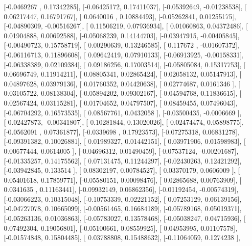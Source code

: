 \documentclass{article}
\begin{document}
       [-0.0469267 ,  0.17342285],
       [-0.06425172,  0.17411037],
       [-0.05392649, -0.01238538],
       [ 0.06217447,  0.16791767],
       [ 0.0640016 ,  0.10884493],
       [-0.05262841,  0.01255175],
       [-0.04890309, -0.00516267],
       [ 0.11506219,  0.07936934],
       [ 0.01060863,  0.04372486],
       [ 0.01904888,  0.00692588],
       [-0.05068239,  0.14144703],
       [-0.03947915, -0.00405845],
       [-0.00490723,  0.15758719],
       [ 0.00290639,  0.13246585],
       [ 0.117672  , -0.01607372],
       [-0.06116713,  0.11896608],
       [ 0.09642419,  0.07910133],
       [-0.06913925, -0.00158331],
       [-0.06338389,  0.02109384],
       [ 0.09186256,  0.17003514],
       [-0.05805084,  0.15317753],
       [ 0.06696749,  0.11914211],
       [ 0.08805341,  0.02865424],
       [ 0.02058132,  0.05147913],
       [ 0.04897628,  0.03979136],
       [ 0.01760352,  0.04420638],
       [ 0.02774687,  0.0161346 ],
       [ 0.03105722,  0.08138304],
       [-0.05894202,  0.09302167],
       [-0.04594768,  0.11836615],
       [ 0.02567424,  0.03115281],
       [ 0.01704652,  0.04797507],
       [ 0.08459455,  0.07496043],
       [-0.06704292,  0.16573535],
       [ 0.08567761,  0.0432058 ],
       [-0.03500435, -0.0006669 ],
       [-0.02427873, -0.00341807],
       [ 0.10281844,  0.13020026],
       [ 0.02474474,  0.05898775],
       [-0.0562091 ,  0.07361877],
       [-0.0339698 ,  0.17923573],
       [-0.07275318,  0.06831278],
       [-0.09391382,  0.10026881],
       [ 0.01989327,  0.01442151],
       [ 0.03971906,  0.01598983],
       [ 0.00677444,  0.0614005 ],
       [-0.04696312,  0.01490459],
       [-0.07537124, -0.00201687],
       [-0.01335257,  0.14175562],
       [ 0.07131475,  0.11244297],
       [-0.02430263,  0.12421292],
       [-0.03942845,  0.133514  ],
       [ 0.08302197,  0.00784527],
       [ 0.03370179,  0.0606009 ],
       [ 0.05401618,  0.17859771],
       [-0.05580151,  0.00098476],
       [ 0.02865688,  0.00763909],
       [ 0.0341635 ,  0.11163441],
       [-0.09932149,  0.06862356],
       [-0.01192454, -0.00574319],
       [-0.03066223,  0.10315048],
       [-0.10753339,  0.02221152],
       [ 0.07253129,  0.06139156],
       [-0.04727078,  0.10665099],
       [-0.00561465,  0.16684189],
       [-0.05789168,  0.05019371],
       [-0.05263136,  0.01036863],
       [-0.05783027,  0.13578468],
       [-0.05038247,  0.04715936],
       [ 0.07492304,  0.19056801],
       [-0.05100661,  0.08559925],
       [ 0.04953995,  0.01107578],
       [-0.01574848,  0.15804485],
       [ 0.03788808,  0.15488632],
       [-0.11064059,  0.1274238 ],
\end{document}
